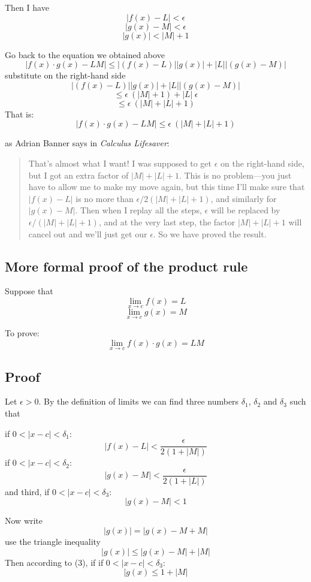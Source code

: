 \documentclass[11pt, oneside]{article}   	%
\begin{document}
Then I have
\[ |f(x) - L | < \epsilon \]
\[ |g(x) - M | < \epsilon \]
\[ |g(x)| < |M| + 1 \]

Go back to the equation we obtained above
\[ |f(x) \cdot g(x) - LM| \le |(f(x) - L) | | g(x)| + | L | | (g(x) - M )| \]
substitute on the right-hand side
\[ |(f(x) - L) | | g(x)| + | L | | (g(x) - M )| \]
\[ \le \epsilon \ (|M| + 1) + | L | \ \epsilon \]
\[ \le \epsilon \ (|M| + |L| + 1) \]
That is:
\[ |f(x) \cdot g(x) - LM| \le \epsilon \ (|M| + |L| + 1) \]

as Adrian Banner says in \emph{Calculus Lifesaver}:

\begin{quote}
That's almost what I want!  I was supposed to get $\epsilon$ on the right-hand side, but I got an extra factor of $|M| + |L| + 1$.  This is no problem---you just have to allow me to make my move again, but this time I'll make sure that $|f(x) - L|$ is no more than $\epsilon/2(|M| + |L| + 1)$, and similarly for $|g(x) - M|$.  Then when I replay all the steps, $\epsilon$ will be replaced by $\epsilon/(|M| + |L| + 1)$, and at the very last step, the factor $|M| + |L| + 1$ will cancel out and we'll just get our $\epsilon$.  So we have proved the result.
\end{quote}

\subsection*{More formal proof of the product rule}

Suppose that 
\[ \lim_{x \rightarrow c} f(x) = L \]
\[ \lim_{x \rightarrow c} g(x) = M \]

To prove:
\[ \lim_{x \rightarrow c} f(x) \cdot g(x) = LM \]

\subsection*{Proof}
Let $\epsilon > 0$.  By the definition of limits we can find three numbers $\delta_1$, $\delta_2$ and $\delta_3$ such that

if $0 < |x - c| < \delta_1$:
\[ |f(x) - L| < \frac{\epsilon}{2(1 + |M|)} \]
if $0 < |x - c| < \delta_2$:
\[ |g(x) - M| < \frac{\epsilon}{2(1 + |L|)} \]
and third, if $0 < |x - c| < \delta_3$:
\[ |g(x) - M| < 1 \]

Now write
\[ |g(x)| = |g(x) - M + M| \]
use the triangle inequality
\[ |g(x)| \le |g(x) - M| + |M|\]
Then according to (3), if if $0 < |x - c| < \delta_3$:
\[ |g(x) \le 1 + |M|  \]
\end{document}
